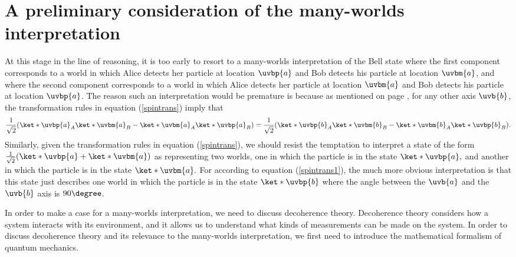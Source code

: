 \section{A preliminary consideration of the many-worlds interpretation}
     At this stage in the line of reasoning, it is too early to resort to a many-worlds interpretation of the Bell state where  the first component corresponds to a world in which Alice detects her particle at location $\uvbp{a}$ and Bob detects his particle at location $\uvbm{a}$, and where the second component corresponds to a world in which Alice detects her particle at location $\uvbm{a}$ and Bob detects his particle at location $\uvbp{a}$. The reason such an interpretation would be premature  is  because as mentioned on page \pageref{bellstate2}, for any other axis $\uvb{b}$, the transformation rules in equation (\ref{spintrans}) imply that
    \begin{equation*}\frac{1}{\sqrt{2}}(\ket*{\uvbp{a}}_A\ket*{\uvbm{a}}_B-\ket*{\uvbm{a}}_A\ket*{\uvbp{a}}_B)=\frac{1}{\sqrt{2}}(\ket*{\uvbp{b}}_A\ket*{\uvbm{b}}_B-\ket*{\uvbm{b}}_A\ket*{\uvbp{b}}_B).\end{equation*}
    Similarly, given the transformation rules in equation (\ref{spintrans}), we should resist the temptation  to interpret a state of the form $\frac{1}{\sqrt{2}}(\ket*{\uvbp{a}}+\ket*{\uvbm{a}})$ as representing two worlds, one in which the particle is in the state $\ket*{\uvbp{a}},$ and another in which the particle is in the state $\ket*{\uvbm{a}}.$ For according to equation (\ref{spintrans1}), the much more obvious interpretation is that this state just describes one world in which the particle is in the state $\ket*{\uvbp{b}}$ where the angle between
     the $\uvb{a}$ and the  $\uvb{b}$ axis is $90\degree$.\footnotemark
     
    In order to make a case for a many-worlds interpretation, we need to discuss decoherence theory. Decoherence theory considers how a system interacts with its environment, and it allows us to understand what kinds of measurements can be made on the system. In order to discuss decoherence theory and its relevance to the many-worlds interpretation, we first need to introduce the mathematical formalism of quantum mechanics.
   